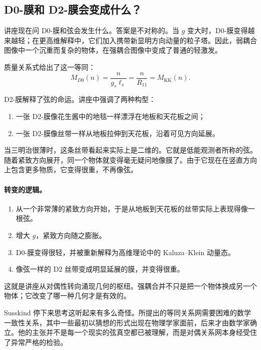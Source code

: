 \subsection{D0-膜和 D2-膜会变成什么？}

讲座现在问 D0-膜和弦会发生什么。答案是不对称的。当 \(g\) 变大时，D0-膜变得越来越轻；在更高维解释中，它们加入携带新显明方向动量的粒子塔。因此，弱耦合图像中一个沉重而复杂的物体，在强耦合图像中变成了普通的轻激发。

质量关系式给出了这一等同：
\begin{equation}
M_{D0}(n)=\frac{n}{g_s\ell_s}
=\frac{n}{R_{11}}
=M_{\mathrm{KK}}(n).
\end{equation}

D2-膜解释了弦的命运。讲座中强调了两种构型：
\begin{enumerate}
\item 一张 D2-膜像花生酱中的地毯一样漂浮在地板和天花板之间；
\item 一张 D2-膜像丝带一样从地板拉伸到天花板，沿着可见方向延展。
\end{enumerate}
当三明治很薄时，这条丝带看起来实际上是二维的。它就是低能观测者所称的弦。随着紧致方向展开，同一个物体就变得毫无疑问地像膜了。由于它现在在竖直方向上包含更多物质，它变得很重，不再像弦。

\paragraph{转变的逻辑。}
\begin{enumerate}
\item 从一个非常薄的紧致方向开始，于是从地板到天花板的丝带实际上表现得像一根弦。
\item 增大 \(g\)，紧致方向随之膨胀。
\item D0-膜变得很轻，并被重新解释为高维理论中的 Kaluza--Klein 动量态。
\item 像弦一样的 D2 丝带变成明显延展的膜，并变得很重。
\end{enumerate}
这就是讲座从对偶性转向涌现几何的枢纽。强耦合并不只是把一个物体换成另一个物体；它改变了哪一种几何才是有效的。

Susskind 停下来思考这听起来有多么奇怪。所提出的等同关系网需要困难的数学一致性关系，其中一些最初以猜想的形式出现在物理学家面前，后来才由数学家确立。他的主张并不是每一个现实的弦真空都已被理解，而是对偶关系网本身经受住了异常严格的检验。


